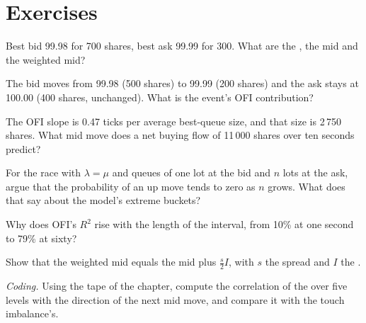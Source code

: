\section{Exercises}

\begin{exercise}[$\star$]\label{exo:rs:order-book-features:1}
Best bid 99.98 for 700 shares, best ask 99.99 for 300. What are the , the mid and the weighted mid?
\end{exercise}

\begin{exercise}[$\star$]\label{exo:rs:order-book-features:2}
The bid moves from 99.98 (500 shares) to 99.99 (200 shares) and the ask stays at 100.00 (400 shares, unchanged). What is the event's OFI
contribution?
\end{exercise}

\begin{exercise}[$\star$]\label{exo:rs:order-book-features:3}
The OFI slope is 0.47 ticks per average best-queue size, and that size is 2\,750 shares. What mid move does a net buying flow of 11\,000
shares over ten seconds predict?
\end{exercise}

\begin{exercise}[$\star\star$]\label{exo:rs:order-book-features:4}
For the race with $\lambda = \mu$ and queues of one lot at the bid and $n$ lots at the ask, argue that the probability of an up move tends to
zero as $n$ grows. What does that say about the model's extreme buckets?
\end{exercise}

\begin{exercise}[$\star\star$]\label{exo:rs:order-book-features:5}
Why does OFI's $R^2$ rise with the length of the interval, from 10\% at one second to 79\% at sixty?
\end{exercise}

\begin{exercise}[$\star\star$]\label{exo:rs:order-book-features:6}
Show that the weighted mid equals the mid plus $\tfrac s2 I$, with $s$ the spread and $I$ the .
\end{exercise}

\begin{exercise}[$\star\star\star$]\label{exo:rs:order-book-features:7}
\emph{Coding.} Using the tape of the chapter, compute the correlation of the  over five levels with the direction of the
next mid move, and compare it with the touch imbalance's.
\end{exercise}


